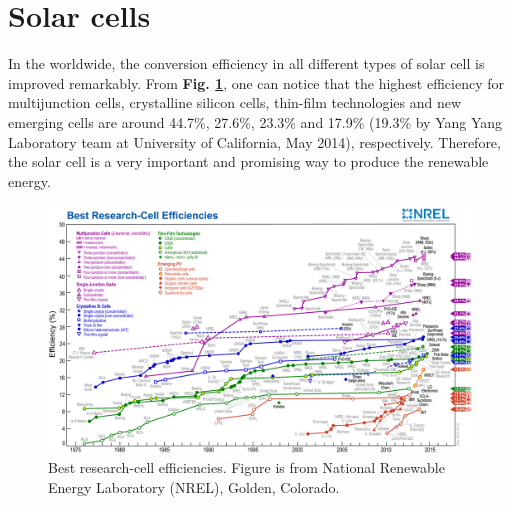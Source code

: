 \documentclass[a4paper, 12pt, titlepage,oneside,drop]{kthesis}
\begin{document}
\section{Solar cells}
In the worldwide, the conversion efficiency in all different types of solar cell is improved remarkably. From \textbf{Fig. \ref{nrel}}, one can notice that the highest efficiency for multijunction cells, crystalline silicon cells,
thin-film technologies and new emerging cells are around 44.7\%, 27.6\%, 23.3\% and 17.9\% (19.3\% by Yang Yang Laboratory team at University of California, May 2014), respectively. Therefore, the solar cell is a very important and promising way to produce the
renewable energy.


\begin{figure}
\captionsetup{width=1\textwidth}
\centering
\includegraphics[scale=0.7]{efficiency_chart.jpg}
\caption{Best research-cell efficiencies. Figure is from National Renewable Energy Laboratory (NREL), Golden, Colorado.}
\label{nrel}
\end{figure}
\end{document}
